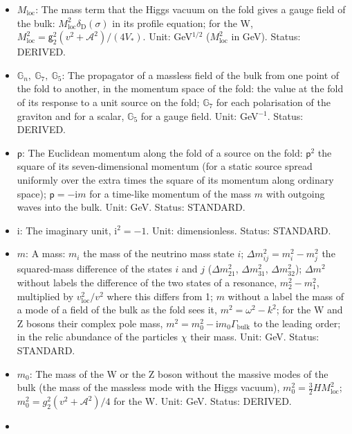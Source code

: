 \documentclass[
  10pt,
]{article}
\providecommand{\tightlist}{%
  \setlength{\itemsep}{0pt}\setlength{\parskip}{0pt}}
\begin{document}
\begin{itemize}
\tightlist
\item
  \(M_{\mathrm{loc}}\): The mass term that the Higgs vacuum on the fold
  gives a gauge field of the bulk:
  \(M_{\mathrm{loc}}^2\delta_{\mathrm{D}}(\sigma)\) in its profile
  equation; for the W,
  \(M_{\mathrm{loc}}^2 = \mathsf{g}_2^2(v^2 + \mathcal{A}^2)/(4V_*)\).
  Unit: GeV\(^{1/2}\) (\(M_{\mathrm{loc}}^2\) in GeV). Status: DERIVED.
\item
  \(\mathbb{G}_n,\ \mathbb{G}_7,\ \mathbb{G}_5\): The propagator of a
  massless field of the bulk from one point of the fold to another, in
  the momentum space of the fold: the value at the fold of its response
  to a unit source on the fold; \(\mathbb{G}_7\) for each polarisation
  of the graviton and for a scalar, \(\mathbb{G}_5\) for a gauge field.
  Unit: GeV\(^{-1}\). Status: DERIVED.
\item
  \(\mathsf{p}\): The Euclidean momentum along the fold of a source on
  the fold: \(\mathsf{p}^2\) the square of its seven-dimensional
  momentum (for a static source spread uniformly over the extra times
  the square of its momentum along ordinary space);
  \(\mathsf{p} = -\mathrm{i}m\) for a time-like momentum of the mass
  \(m\) with outgoing waves into the bulk. Unit: GeV. Status: STANDARD.
\item
  \(\mathrm{i}\): The imaginary unit, \(\mathrm{i}^2 = -1\). Unit:
  dimensionless. Status: STANDARD.
\item
  \(m\): A mass: \(m_i\) the mass of the neutrino mass state \(i\);
  \(\Delta m_{ij}^2 = m_i^2 - m_j^2\) the squared-mass difference of the
  states \(i\) and \(j\) (\(\Delta m_{21}^2\), \(\Delta m_{31}^2\),
  \(\Delta m_{32}^2\)); \(\Delta m^2\) without labels the difference of
  the two states of a resonance, \(m_2^2 - m_1^2\), multiplied by
  \(v_{\mathrm{loc}}^2/v^2\) where this differs from 1; \(m\) without a
  label the mass of a mode of a field of the bulk as the fold sees it,
  \(m^2 = \omega^2 - k^2\); for the W and Z bosons their complex pole
  mass, \(m^2 = m_0^2 - \mathrm{i}m_0\Gamma_{\mathrm{bulk}}\) to the
  leading order; in the relic abundance of the particles \(\chi\) their
  mass. Unit: GeV. Status: STANDARD.
\item
  \(m_0\): The mass of the W or the Z boson without the massive modes of
  the bulk (the mass of the massless mode with the Higgs vacuum),
  \(m_0^2 = \frac32HM_{\mathrm{loc}}^2\);
  \(m_0^2 = g_2^2(v^2 + \mathcal{A}^2)/4\) for the W. Unit: GeV. Status:
  DERIVED.
\item

\end{itemize}
\end{document}
